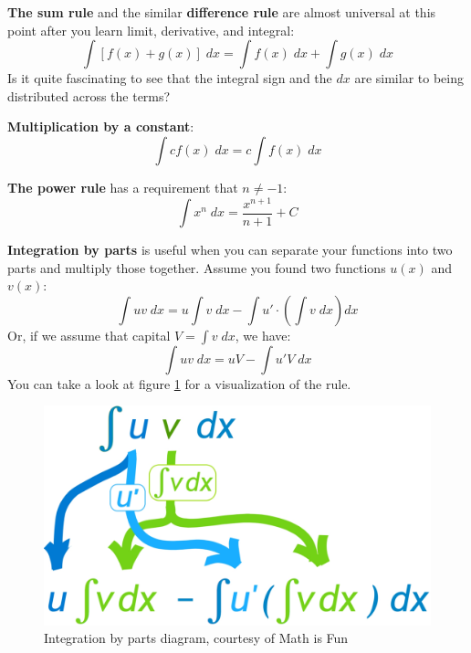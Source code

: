 \textbf{The sum rule} and the similar \textbf{difference rule} are almost universal at this point after you learn limit, derivative, and integral:
\begin{equation}
    \int [f(x) + g(x)] \;dx
    = \int f(x) \;dx + \int g(x) \;dx
\end{equation}
Is it quite fascinating to see that the integral sign and the $dx$ are similar to being distributed across the terms?

\textbf{Multiplication by a constant}:
\begin{equation}
    \int cf(x) \;dx = c\int f(x) \;dx
\end{equation}

\textbf{The power rule} has a requirement that $n \neq -1$:
\begin{equation}
    \label{eq:m4}
    \int x^n \;dx
    = \frac{x^{n+1}}{n+1} + C
\end{equation}

\textbf{Integration by parts} is useful when you can separate your functions into two parts and multiply those together. Assume you found two functions $u(x)$ and $v(x)$:
\begin{equation}\label{eq:m5}
    \int u v \;dx
    = u \int v \;dx - \int u' \cdot \left(\int v \;dx\right) dx
\end{equation}
Or, if we assume that capital $V=\int v\;dx$, we have:
\begin{equation}
    \int u v \; dx
    = uV - \int u' V \; dx
\end{equation}
You can take a look at figure \ref{fig:m15} for a visualization of the rule.
\begin{figure}
    \centering
    \centering
    \includegraphics[width=0.5\linewidth]{math/15.png}
    \caption{Integration by parts diagram, courtesy of Math is Fun}
    \label{fig:m15}
\end{figure}

